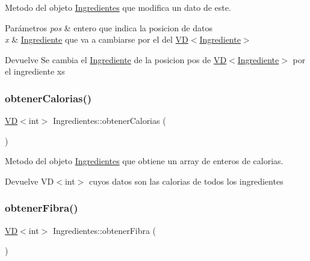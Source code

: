 Metodo del objeto \hyperlink{classIngredientes}{Ingredientes} que modifica un dato de este. 


\begin{DoxyParams}{Parámetros}
{\em pos} & entero que indica la posicion de datos \\
\hline
{\em x} & \hyperlink{classIngrediente}{Ingrediente} que va a cambiarse por el del \hyperlink{classVD}{V\+D$<$\+Ingrediente$>$} \\
\hline
\end{DoxyParams}
\begin{DoxyReturn}{Devuelve}
Se cambia el \hyperlink{classIngrediente}{Ingrediente} de la posicion pos de \hyperlink{classVD}{V\+D$<$\+Ingrediente$>$} por el ingrediente xs 
\end{DoxyReturn}
\mbox{\label{classIngredientes_a200af458def970ff66a49f61f9489bef}} 
\subsubsection{\texorpdfstring{obtener\+Calorias()}{obtenerCalorias()}}
{\footnotesize\ttfamily \hyperlink{classVD}{VD}$<$int$>$ Ingredientes\+::obtener\+Calorias (\begin{DoxyParamCaption}{ }\end{DoxyParamCaption})}



Metodo del objeto \hyperlink{classIngredientes}{Ingredientes} que obtiene un array de enteros de calorias. 

\begin{DoxyReturn}{Devuelve}
V\+D$<$int$>$ cuyos datos son las calorias de todos los ingredientes 
\end{DoxyReturn}
\mbox{\label{classIngredientes_a89dcec2070874e3f288a6d46ab0b381a}} 
\subsubsection{\texorpdfstring{obtener\+Fibra()}{obtenerFibra()}}
{\footnotesize\ttfamily \hyperlink{classVD}{VD}$<$int$>$ Ingredientes\+::obtener\+Fibra (\begin{DoxyParamCaption}{ }\end{DoxyParamCaption})}



